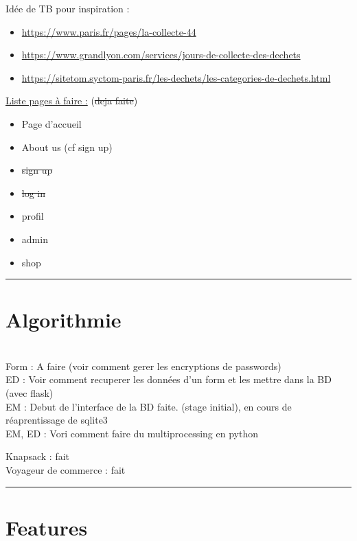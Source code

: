 \documentclass[10pt,a4paper]{report}
\begin{document}
Idée de TB pour inspiration : 
\begin{itemize}
        \item \url{https://www.paris.fr/pages/la-collecte-44}
        \item \url{https://www.grandlyon.com/services/jours-de-collecte-des-dechets }
        \item \url{https://sitetom.syctom-paris.fr/les-dechets/les-categories-de-dechets.html}
\end{itemize}

\uline{Liste pages à faire :} (\sout{deja faite})
\begin{itemize}
        \item Page d'accueil
        \item About us (cf sign up)
        \item \sout{sign up}
        \item \sout{log in}
        \item profil
        \item admin
        \item shop
\end{itemize}

\rule{\linewidth}{0.5mm} \bigskip
\section{Algorithmie}
\ \\

Form : A faire (voir comment gerer les encryptions de passwords) \\

ED : Voir comment recuperer les données d'un form et les mettre dans la BD (avec flask) \\

EM : Debut de l'interface de la BD faite. (stage initial), en cours de réaprentissage de sqlite3 \\

EM, ED : Vori comment faire du multiprocessing en python

Knapsack : fait\ \\

Voyageur de commerce : fait


\rule{\linewidth}{0.5mm} \bigskip
\section{Features}
\end{document}

